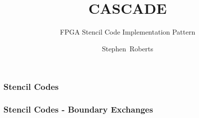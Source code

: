 \documentclass{beamer}
\title{CASCADE}
\subtitle{FPGA Stencil Code Implementation Pattern}
\author{Stephen~Roberts}
\institute{The University Of Warwick}
\begin{document}
  \frame{\titlepage}
  \begin{frame}
    \frametitle{Stencil Codes}
    \begin{figure}
      \centering
      
    \end{figure}
  \end{frame}

  \begin{frame}
    \frametitle{Stencil Codes - Boundary Exchanges}
    \begin{figure}
      \centering
      
    \end{figure}
  \end{frame}
\end{document}
